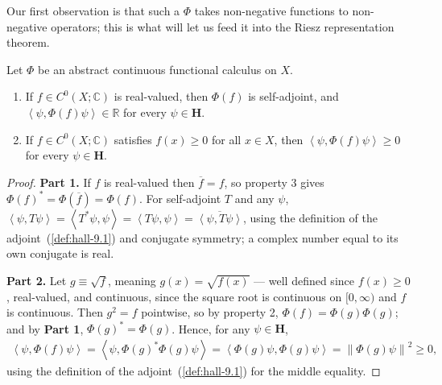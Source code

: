 Our first observation is that such a $\Phi$ takes non-negative functions to non-negative operators; this is what will let us feed it into the Riesz representation theorem.

\begin{lemma}
    \label{lmm:abstract-calculus-non-negative}
    \leanok
    Let $\Phi$ be an abstract continuous functional calculus on $X$.
    \begin{enumerate}
        \item If $f \in C^0(X;\mathbb{C})$ is real-valued, then $\Phi(f)$ is self-adjoint, and $\left< \psi, \Phi(f)\psi \right> \in \mathbb{R}$ for every $\psi \in \mathbf{H}$.
        \item If $f \in C^0(X;\mathbb{C})$ satisfies $f(x) \ge 0$ for all $x \in X$, then $\left< \psi, \Phi(f)\psi \right> \ge 0$ for every $\psi \in \mathbf{H}$.
    \end{enumerate}
\end{lemma}
\begin{proof}
    \leanok
\textbf{Part 1.} If $f$ is real-valued then $\overline f = f$, so property 3 gives $\Phi(f)^* = \Phi(\overline f) = \Phi(f)$. For self-adjoint $T$ and any $\psi$, $\left< \psi, T\psi \right> = \left< T^*\psi, \psi \right> = \left< T\psi,\psi \right> = \overline{\left< \psi, T\psi \right>}$, using the definition of the adjoint~(\ref{def:hall-9.1}) and conjugate symmetry; a complex number equal to its own conjugate is real.

\textbf{Part 2.} Let $g \equiv \sqrt{f}$, meaning $g(x) = \sqrt{f(x)}$ — well defined since $f(x)\ge 0$, real-valued, and continuous, since the square root is continuous on $[0,\infty)$ and $f$ is continuous. Then $g^2 = f$ pointwise, so by property 2, $\Phi(f) = \Phi(g)\Phi(g)$; and by \textbf{Part 1}, $\Phi(g)^* = \Phi(g)$. Hence, for any $\psi \in \mathbf{H}$,
\begin{align}
    \left< \psi, \Phi(f)\psi \right> = \left< \psi, \Phi(g)^*\Phi(g)\psi \right> = \left< \Phi(g)\psi, \Phi(g)\psi \right> = \left\| \Phi(g)\psi \right\|^2 \ge 0,
\end{align}
using the definition of the adjoint~(\ref{def:hall-9.1}) for the middle equality.
\end{proof}

